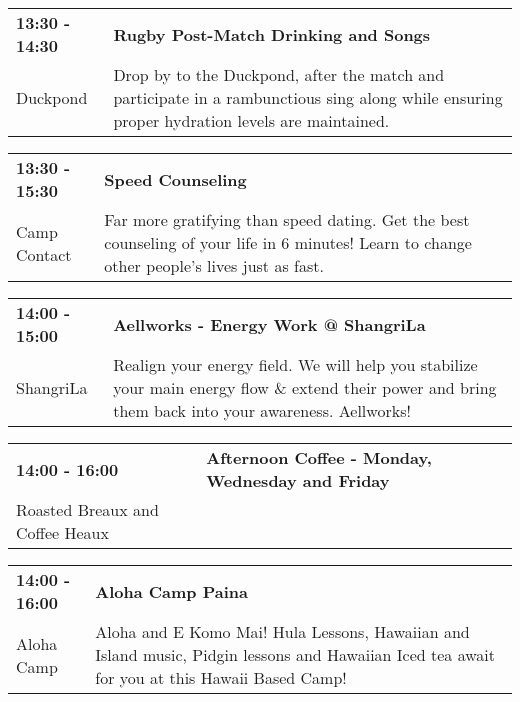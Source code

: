 \begin{tabular}{ p{1in} p{2.2in} }
    \textbf{13:30 - 14:30} & \textbf{Rugby Post-Match Drinking and Songs} \\
    Duckpond \newline  & Drop by to the Duckpond, after the match and participate in a rambunctious sing along while ensuring proper hydration levels are maintained. \\
    \hline 
\end{tabular}
    
\begin{tabular}{ p{1in} p{2.2in} }
    \textbf{13:30 - 15:30} & \textbf{Speed Counseling} \\
    Camp Contact \newline  & Far more gratifying than speed dating. Get the best counseling of your life in 6 minutes! Learn to change other people's lives just as fast. \\
    \hline 
\end{tabular}
    
\begin{tabular}{ p{1in} p{2.2in} }
    \textbf{14:00 - 15:00} & \textbf{Aellworks - Energy Work @ ShangriLa} \\
    ShangriLa \newline  & Realign your energy field. We will help you stabilize your main energy flow \& extend their power and bring them back into your awareness. Aellworks! \\
    \hline 
\end{tabular}
    
\begin{tabular}{ p{1in} p{2.2in} }
    \textbf{14:00 - 16:00} & \textbf{Afternoon Coffee - Monday, Wednesday and Friday} \\
    Roasted Breaux and Coffee Heaux \newline  &  \\
    \hline 
\end{tabular}
    
\begin{tabular}{ p{1in} p{2.2in} }
    \textbf{14:00 - 16:00} & \textbf{Aloha Camp Paina} \\
    Aloha Camp \newline  & Aloha and E Komo Mai!  Hula Lessons, Hawaiian and Island music, Pidgin lessons and Hawaiian Iced tea await for you at this Hawaii Based Camp! \\
    \hline 
\end{tabular}
    
